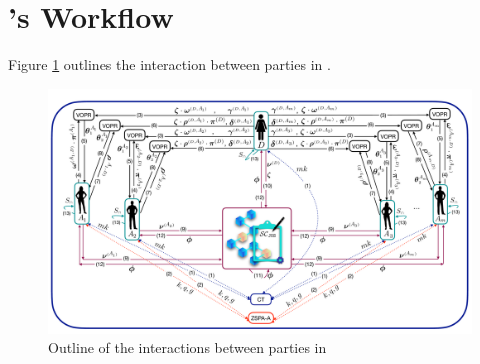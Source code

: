 

\section{\withFai's Workflow}\label{sec::Justitia-workflow}
Figure \ref{fig:parties-interactions-in-Jus} outlines the interaction between parties in \withFai. 


\begin{figure}[!ht]
    \centering
    \includegraphics[width=13cm]{Diag-1.pdf}
     \vspace{-2mm}
    \caption{Outline of the interactions between parties in \withFai}\label{fig:parties-interactions-in-Jus}
\end{figure}


